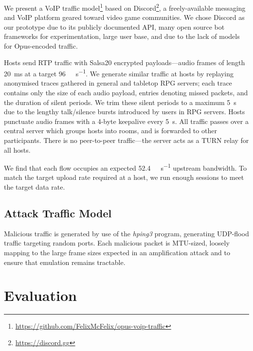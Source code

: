 \documentclass[10pt, times, comsoc]{IEEEtran}
\begin{document}
We present a VoIP traffic model\footnote{\url{https://github.com/FelixMcFelix/opus-voip-traffic}} based on Discord\footnote{\url{https://discord.gg}}, a freely-available messaging and VoIP platform geared toward video game communities.
We chose Discord as our prototype due to its publicly documented API, many open source bot frameworks for experimentation, large user base, and due to the lack of models for Opus-encoded traffic.

Hosts send RTP traffic with Salsa20 encrypted payloads---audio frames of length \SI{20}{\milli\second} at a target \SI{96}{\kilo\bit\per\second}.
We generate similar traffic at hosts by replaying anonymised traces gathered in general and tabletop RPG servers; each trace contains only the size of each audio payload, entries denoting missed packets, and the duration of silent periods.
We trim these silent periods to a maximum \SI{5}{\second} due to the lengthy talk/silence bursts introduced by users in RPG servers.
Hosts punctuate audio frames with a 4-byte keepalive every \SI{5}{\second}.
All traffic passes over a central server which groups hosts into rooms, and is forwarded to other participants.
There is no peer-to-peer traffic---the server acts as a TURN relay \cite{rfc5766} for all hosts.

We find that each flow occupies an expected \SI{52.4}{\kilo\bit\per\second} upstream bandwidth.
To match the target upload rate required at a host, we run enough sessions to meet the target data rate.

\subsection{Attack Traffic Model}
Malicious traffic is generated by use of the \emph{hping3} program, generating UDP-flood traffic targeting random ports.
Each malicious packet is MTU-sized, loosely mapping to the large frame sizes expected in an amplification attack and to ensure that emulation remains tractable.

\section{Evaluation}

\end{document}
